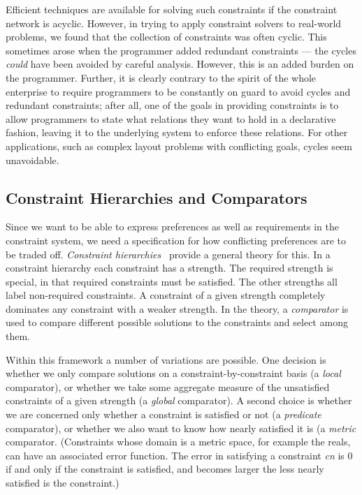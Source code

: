 \documentclass{article}
\newcommand{\strength}{\sf}
\begin{document}
Efficient techniques are available for solving such constraints if the
constraint network is acyclic.  However, in trying to apply constraint
solvers to real-world problems, we found that the collection of constraints
was often cyclic.  This sometimes arose when the programmer
added redundant constraints --- the cycles \emph{could} have been avoided by
careful analysis.  However, this is an added burden on the programmer.
Further, it is clearly contrary to the spirit of the whole enterprise to
require programmers to be constantly on guard to avoid cycles and redundant
constraints; after all, one of the goals in providing constraints is to
allow programmers to state what relations they want to hold in a
declarative fashion, leaving it to the underlying system to enforce these
relations.  For other applications, such as complex layout problems with
conflicting goals,  cycles seem unavoidable.

\subsection{Constraint Hierarchies and Comparators}

Since we want to be able to express preferences as well as requirements
in the constraint system, we need a specification for how conflicting
preferences are to be traded off.  \emph{Constraint
  hierarchies}~\cite{borning-lisp-symbolic-computation-92} provide a
general theory for this.  In a constraint hierarchy each constraint has
a strength.  The {\strength required} strength is special, in that
{\strength required} constraints must be satisfied.  The other strengths
all label non-required constraints.  A constraint of a given strength
completely dominates any constraint with a weaker strength.  In the
theory, a \emph{comparator} is used to compare different possible
solutions to the constraints and select among them.

Within this framework a number of variations are possible.  One decision is
whether we only compare solutions on a constraint-by-constraint basis (a
\emph{local} comparator), or whether we take some aggregate measure of the
unsatisfied constraints of a given strength (a \emph{global} comparator).  A
second choice is whether we are concerned only whether a constraint is
satisfied or not (a \emph{predicate} comparator), or whether we also want to
know how nearly satisfied it is (a \emph{metric} comparator.  (Constraints
whose domain is a metric space, for example the reals, can have an
associated error function.  The error in satisfying a constraint \emph{cn}
is 0 if and only if the constraint is satisfied, and becomes larger the less nearly
satisfied is the constraint.)
\end{document}
